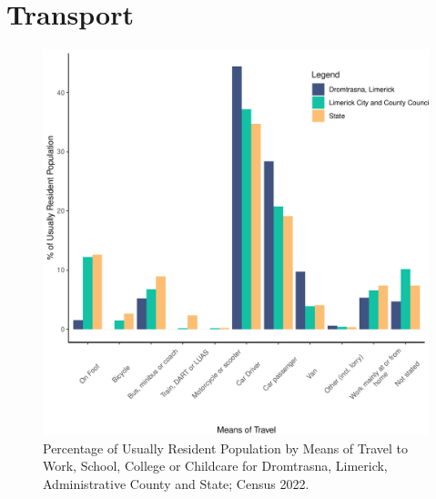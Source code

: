 \documentclass{article}
\begin{document}
\section{Transport}\label{sect:Trans}
\begin{figure}[H]
	\centering
	\includegraphics[width = 120mm]{../figures/TravelED.pdf}
	\caption{Percentage of Usually Resident Population by Means of Travel to Work, School, College or Childcare for Dromtrasna, Limerick, Administrative County and State; Census 2022.}
	\label{fig:vbnv}
	\end{figure}
\end{document}
